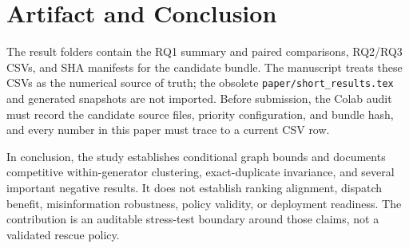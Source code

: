 \documentclass[runningheads]{llncs}
\begin{document}
\section{Artifact and Conclusion}

The result folders contain the RQ1 summary and paired comparisons, RQ2/RQ3
CSVs, and SHA manifests for the candidate bundle. The manuscript treats
these CSVs as the numerical source of truth; the obsolete
\texttt{paper/short\_results.tex} and generated snapshots are not imported.
Before submission, the Colab audit must record the candidate source files,
priority configuration, and bundle hash, and every number in this paper must
trace to a current CSV row.

In conclusion, the study establishes conditional graph bounds and documents
competitive within-generator clustering, exact-duplicate invariance, and
several important negative results. It does not establish ranking alignment,
dispatch benefit, misinformation robustness, policy validity, or deployment
readiness. The contribution is an auditable stress-test boundary around those
claims, not a validated rescue policy.



\end{document}
